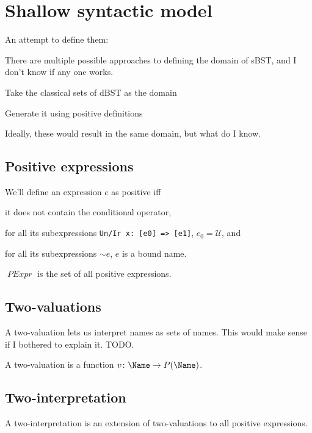 \documentclass[oneside,12pt]{book}
\theoremstyle{definition}
\theoremstyle{remark}
\newcommand{\ct}{{\sim}} %
\newcommand\var[1]{\mathop{\mathit{#1}}\nolimits}
\newcommand{\Universal}{\mathcal{U}}
\newcommand{\PExpr}{\var{PExpr}}
\begin{document}
\begin{defBox}
  
\end{defBox}

\section{Shallow syntactic model}
An attempt to define them:

There are multiple possible approaches to defining the domain of sBST, and I don't
know if any one works.
\begin{compactenum}
  \item Take the classical sets of dBST as the domain
  \item Generate it using positive definitions
\end{compactenum}
Ideally, these would result in the same domain, but what do I know.

\subsection{Positive expressions}

\begin{defBox}
  We'll define an expression $e$ as positive iff
  \begin{compactenum}
    \item it does not contain the conditional operator,
    \item for all its subexpressions \texttt{Un/Ir x: [e0] => [e1]},
      $e_0 = \Universal$, and
    \item for all its subexpressions $\ct e$, $e$ is a bound name.
  \end{compactenum}
  
  \medskip \noindent $\PExpr$ is the set of all positive expressions.
\end{defBox}

\subsection{Two-valuations}
A two-valuation lets us interpret names as sets of names.
This would make sense if I bothered to explain it. TODO.

\begin{defBox}
  A two-valuation is a function $v\colon \Name \to P(\Name)$.
\end{defBox}

\subsection{Two-interpretation}
A two-interpretation is an extension of two-valuations to all positive expressions.
\end{document}
